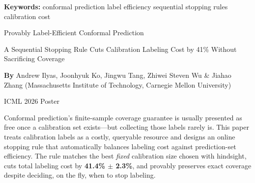 \documentclass[10pt,twocolumn]{article}
\begin{document}
\setlength{\parindent}{0pt}
\setlength{\parskip}{4pt}

{\small\color{keywordgray}\textbf{Keywords:}
  conformal prediction \textbullet{}
  label efficiency \textbullet{}
  sequential stopping rules \textbullet{}
  calibration cost}\par\vspace{4pt}

{\LARGE\bfseries\raggedright
  Provably Label-Efficient Conformal Prediction}\par\vspace{4pt}

{\large\itshape\raggedright
  A Sequential Stopping Rule Cuts Calibration Labeling Cost by 41\%
  Without Sacrificing Coverage}\par\vspace{6pt}

{\small\textbf{By} Andrew Ilyas, Joonhyuk Ko, Jingwu Tang, Zhiwei Steven
  Wu \& Jiahao Zhang
  (Massachusetts Institute of Technology, Carnegie Mellon
  University)}\par\vspace{2pt}

{\small\color{keywordgray}ICML 2026 Poster}
\par\vspace{2pt}\noindent{\color{rulered}\rule{\columnwidth}{0.6pt}}\vspace{6pt}

Conformal prediction's finite-sample coverage guarantee is usually
presented as free once a calibration set exists---but collecting those
labels rarely is. This paper treats calibration labels as a costly,
queryable resource and designs an online stopping rule that
automatically balances labeling cost against prediction-set efficiency.
The rule matches the best \emph{fixed} calibration size chosen with
hindsight, cuts total labeling cost by \textbf{41.4\% $\pm$ 2.3\%}, and
provably preserves exact coverage despite deciding, on the fly, when to
stop labeling.
\end{document}
